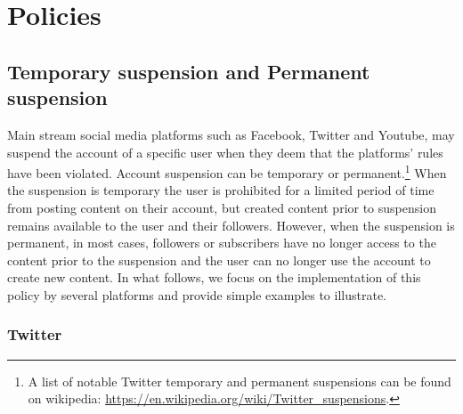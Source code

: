 \documentclass[11pt,a4paper]{article}
\begin{document}
\section{Policies}

\subsection{Temporary suspension and Permanent suspension}

Main stream social media platforms such as Facebook, Twitter and Youtube, may suspend the account of a specific user when they deem that the platforms' rules have been violated. Account suspension can be temporary or permanent.\footnote{A list of notable Twitter temporary and permanent suspensions can be found on wikipedia: \href{https://en.wikipedia.org/wiki/Twitter_suspensions}{https://en.wikipedia.org/wiki/Twitter\_suspensions}.}  When the suspension is temporary the user is prohibited for a limited period of time from posting content on their account, but created content prior to suspension remains available to the user and their followers. However, when the suspension is permanent, in most cases, followers or subscribers have no longer access to the content prior to the suspension and the user can no longer use the account to create new content.  In what follows, we focus on the implementation of this policy by several platforms and provide simple examples to illustrate. 


\smallskip

\subsubsection{Twitter}

\end{document}
